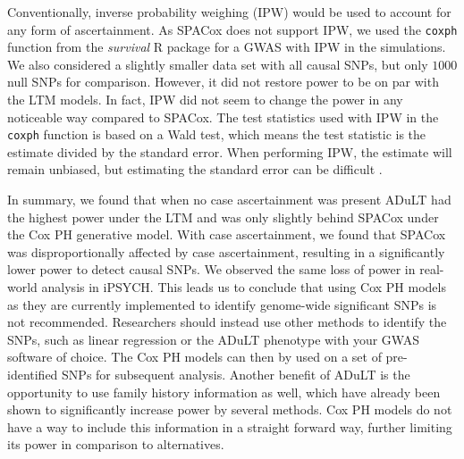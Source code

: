 Conventionally, inverse probability weighing (IPW) would be used to account for any form of ascertainment. As SPACox does not support IPW, we used the \texttt{coxph} function from the \textit{survival} R package \cite{Therneau2020-xf} for a GWAS with IPW in the simulations. We also considered a slightly smaller data set with all causal SNPs, but only $ 1000 $ null SNPs for comparison. However, it did not restore power to be on par with the LTM models. In fact, IPW did not seem to change the power in any noticeable way compared to SPACox. The test statistics used with IPW in the \texttt{coxph} function is based on a Wald test\cite{survivalVignette}, which means the test statistic is the estimate divided by the standard error. When performing IPW, the estimate will remain unbiased, but estimating the standard error can be difficult \cite{austin2016variance}. 


In summary, we found that when no case ascertainment was present ADuLT had the highest power under the LTM and was only slightly behind SPACox under the Cox PH generative model. With case ascertainment, we found that SPACox was disproportionally affected by case ascertainment, resulting in a significantly lower power to detect causal SNPs. We observed the same loss of power in real-world analysis in iPSYCH. This leads us to conclude that using Cox PH models as they are currently implemented to identify genome-wide significant SNPs is not recommended. Researchers should instead use other methods to identify the SNPs, such as linear regression or the ADuLT phenotype with your GWAS software of choice. The Cox PH models can then by used on a set of pre-identified SNPs for subsequent analysis. Another benefit of ADuLT is the opportunity to use family history information as well, which have already been shown to significantly increase power by several methods. Cox PH models do not have a way to include this information in a straight forward way, further limiting its power in comparison to alternatives.










